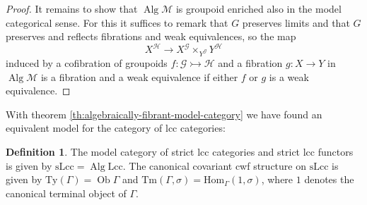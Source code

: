 \documentclass{article}
\theoremstyle{remark}
\theoremstyle{definition}
\newtheorem{definition}{Definition}
\begin{document}
\begin{proof}
  It remains to show that $\operatorname{Alg} \mathcal{M}$ is groupoid enriched also in the model categorical sense.
  For this it suffices to remark that $G$ preserves limits and that $G$ preserves and reflects fibrations and weak equivalences, so the map
  \begin{equation}
    X^\mathcal{H} \rightarrow X^\mathcal{G} \times_{Y^\mathcal{G}} Y^\mathcal{H}
  \end{equation}
  induced by a cofibration of groupoids $f : \mathcal{G} \rightarrowtail \mathcal{H}$ and a fibration $g : X \rightarrow Y$ in $\operatorname{Alg} \mathcal{M}$ is a fibration and a weak equivalence if either $f$ or $g$ is a weak equivalence.
\end{proof}

With theorem \ref{th:algebraically-fibrant-model-category} we have found an equivalent model for the category of lcc categories:
\begin{definition}
  The model category of strict lcc categories and strict lcc functors is given by $\mathrm{sLcc} = \operatorname{Alg} \mathrm{Lcc}$.
  The canonical covariant cwf structure on $\mathrm{sLcc}$ is given by $\mathrm{Ty}(\Gamma) = \operatorname{Ob} \Gamma$ and $\mathrm{Tm}(\Gamma, \sigma) = \mathrm{Hom}_\Gamma(1, \sigma)$, where $1$ denotes the canonical terminal object of $\Gamma$.
\end{definition}
\end{document}
